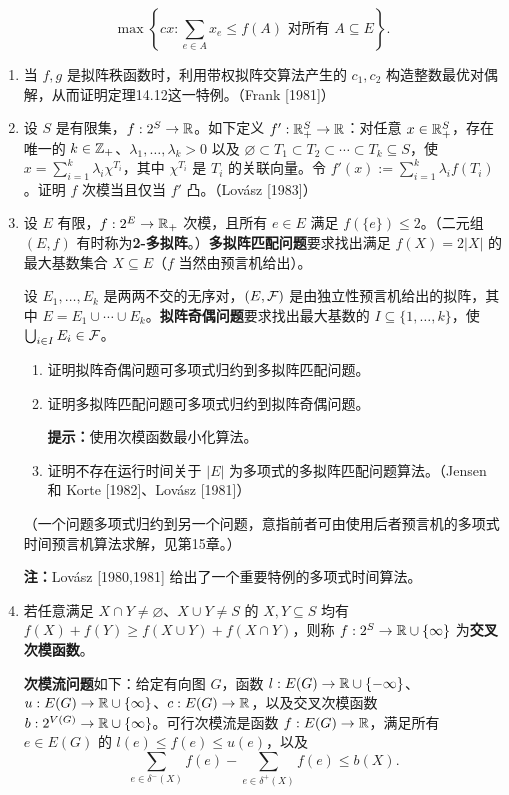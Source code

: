 \[\max\left\{cx:\sum_{e\in A}x_e\le f(A)\text{ 对所有 }A\subseteq E\right\}.\]
\begin{enumerate}[label=\arabic*.,start=8]
\item 当 $f,g$ 是拟阵秩函数时，利用带权拟阵交算法产生的 $c_1,c_2$ 构造整数最优对偶解，从而证明定理14.12这一特例。（Frank [1981]）
\item[$9.^*$] 设 $S$ 是有限集，$f:2^S\to\mathbb R$。如下定义 $f':\mathbb R_+^S\to\mathbb R$：对任意 $x\in\mathbb R_+^S$，存在唯一的 $k\in\mathbb Z_+$、$\lambda_1,\ldots,\lambda_k>0$ 以及 $\varnothing\subset T_1\subset T_2\subset\cdots\subset T_k\subseteq S$，使 $x=\sum_{i=1}^k\lambda_i\chi^{T_i}$，其中 $\chi^{T_i}$ 是 $T_i$ 的关联向量。令 $f'(x):=\sum_{i=1}^k\lambda_i f(T_i)$。证明 $f$ 次模当且仅当 $f'$ 凸。（Lovász [1983]）
\setcounter{enumi}{9}
\item 设 $E$ 有限，$f:2^E\to\mathbb R_+$ 次模，且所有 $e\in E$ 满足 $f(\{e\})\le2$。（二元组 $(E,f)$ 有时称为\textbf{2-多拟阵}。）\textbf{多拟阵匹配问题}要求找出满足 $f(X)=2|X|$ 的最大基数集合 $X\subseteq E$（$f$ 当然由预言机给出）。
\par 设 $E_1,\ldots,E_k$ 是两两不交的无序对，$(E,\mathcal F)$ 是由独立性预言机给出的拟阵，其中 $E=E_1\cup\cdots\cup E_k$。\textbf{拟阵奇偶问题}要求找出最大基数的 $I\subseteq\{1,\ldots,k\}$，使 $\bigcup_{i\in I}E_i\in\mathcal F$。
\begin{enumerate}[label=(\alph*)]
\item 证明拟阵奇偶问题可多项式归约到多拟阵匹配问题。
\item[(b)$^*$] 证明多拟阵匹配问题可多项式归约到拟阵奇偶问题。\par
\textbf{提示：}使用次模函数最小化算法。
\item[(c)$^*$] 证明不存在运行时间关于 $|E|$ 为多项式的多拟阵匹配问题算法。（Jensen 和 Korte [1982]、Lovász [1981]）
\end{enumerate}
（一个问题多项式归约到另一个问题，意指前者可由使用后者预言机的多项式时间预言机算法求解，见第15章。）\par
\textbf{注：}Lovász [1980,1981] 给出了一个重要特例的多项式时间算法。
\item 若任意满足 $X\cap Y\ne\varnothing$、$X\cup Y\ne S$ 的 $X,Y\subseteq S$ 均有 $f(X)+f(Y)\ge f(X\cup Y)+f(X\cap Y)$，则称 $f:2^S\to\mathbb R\cup\{\infty\}$ 为\textbf{交叉次模函数}。
\par \textbf{次模流问题}如下：给定有向图 $G$，函数 $l:E(G)\to\mathbb R\cup\{-\infty\}$、$u:E(G)\to\mathbb R\cup\{\infty\}$、$c:E(G)\to\mathbb R$，以及交叉次模函数 $b:2^{V(G)}\to\mathbb R\cup\{\infty\}$。可行次模流是函数 $f:E(G)\to\mathbb R$，满足所有 $e\in E(G)$ 的 $l(e)\le f(e)\le u(e)$，以及
\[\sum_{e\in\delta^-(X)}f(e)-\sum_{e\in\delta^+(X)}f(e)\le b(X).\]
\end{enumerate}

